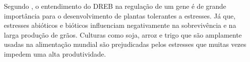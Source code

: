 Segundo \cite{Agarwal2006}, o entendimento do DREB na regulação de um gene é de grande importância para o desenvolvimento de plantas tolerantes a estresses. Já que, estresses abióticos e bióticos influenciam negativamente na sobrevivência e na larga produção de grãos. Culturas como soja, arroz e trigo que são amplamente usadas na alimentação mundial são prejudicadas pelos estresses que muitas vezes impedem uma alta produtividade. 
